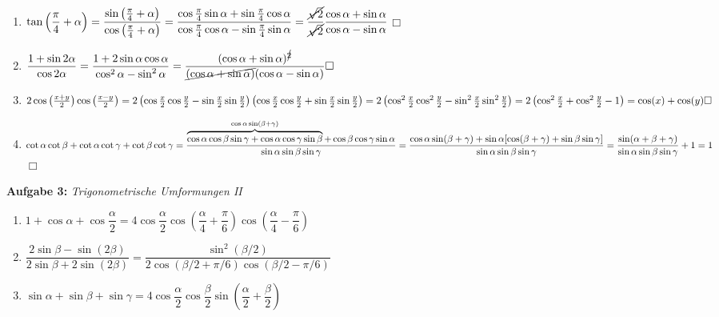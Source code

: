 \begin{enumerate}[label=(\alph*)]
\item $\tan\left(\dfrac{\pi}{4}+\alpha\right)=\dfrac{\sin\left(\frac{\pi}{4}+\alpha\right)}{\cos\left(\frac{\pi}{4}+\alpha\right)}=\dfrac{\cos\frac{\pi}{4}\sin\alpha+\sin\frac{\pi}{4}\cos\alpha}{\cos\frac{\pi}{4}\cos\alpha-\sin\frac{\pi}{4}\sin\alpha}=\dfrac{\cancel{\sqrt{2}}}{\cancel{\sqrt{2}}}\dfrac{\cos\alpha+\sin\alpha}{\cos\alpha-\sin\alpha}$\hfill$\Box$
\item $\dfrac{1+\sin 2\alpha}{\cos 2\alpha}=\dfrac{1+2\sin\alpha\cos\alpha}{\cos^2\alpha-\sin^2\alpha}=\dfrac{(\cos\alpha+\sin\alpha)^{\cancel{2}}}{\cancel{(\cos\alpha+\sin\alpha)}(\cos\alpha-\sin\alpha)}\hfill\Box$
\item $2\cos\left(\frac{x+y}{2}\right)\cos\left(\frac{x-y}{2}\right)=2\left(\cos\frac{x}{2}\cos\frac{y}{2}-\sin\frac{x}{2}\sin\frac{y}{2}\right)\left(\cos\frac{x}{2}\cos\frac{y}{2}+\sin\frac{x}{2}\sin\frac{y}{2}\right)\\[0.2cm]
=2\left(\cos^2\frac{x}{2}\cos^2\frac{y}{2}-\sin^2\frac{x}{2}\sin^2\frac{y}{2}\right)=2\left(\cos^2\frac{x}{2}+\cos^2\frac{y}{2}-1\right)=\cos(x)+\cos(y)\hfill\Box$
\item $\cot\alpha\cot\beta+\cot\alpha\cot\gamma+\cot\beta\cot\gamma=\dfrac{\overbrace{\cos\alpha\cos\beta\sin\gamma+\cos\alpha\cos\gamma\sin\beta}^{\cos\alpha\sin(\beta+\gamma)}+\cos\beta\cos\gamma\sin\alpha}{\sin\alpha\sin\beta\sin\gamma}\\[0.2cm]
=\dfrac{\cos\alpha\sin(\beta+\gamma)+\sin\alpha[\cos(\beta+\gamma)+\sin\beta\sin\gamma]}{\sin\alpha\sin\beta\sin\gamma}=\dfrac{\sin(\alpha+\beta+\gamma)}{\sin\alpha\sin\beta\sin\gamma}+1=1$\hfill$\Box$
\end{enumerate}
\vspace{1cm}
%
\newpage
\noindent
\textbf{Aufgabe 3: } \emph{Trigonometrische Umformungen II}
\begin{enumerate}[label=(\alph*)]
\item $1+\cos\alpha+\cos\dfrac{\alpha}{2}=4\cos\dfrac{\alpha}{2}\cos\left(\dfrac{\alpha}{4}+\dfrac{\pi}{6}\right)\cos\left(\dfrac{\alpha}{4}-\dfrac{\pi}{6}\right)$
\item $\dfrac{2\sin\beta-\sin(2\beta)}{2\sin\beta+2\sin(2\beta)}=\dfrac{\sin^2(\beta/2)}{2\cos(\beta/2+\pi/6)\cos(\beta/2-\pi/6)}$
\item $\sin\alpha+\sin\beta+\sin\gamma=4\cos\dfrac{\alpha}{2}\cos\dfrac{\beta}{2}\sin\left(\dfrac{\alpha}{2}+\dfrac{\beta}{2}\right)$
\end{enumerate}
